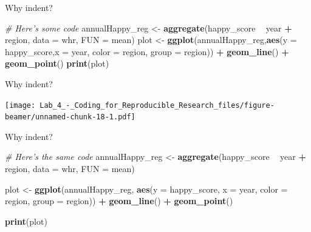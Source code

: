 \documentclass[ignorenonframetext,]{beamer}
\newenvironment{Shaded}{\begin{snugshade}}{\end{snugshade}}
\newcommand{\KeywordTok}[1]{\textcolor[rgb]{0.13,0.29,0.53}{\textbf{#1}}}
\newcommand{\DataTypeTok}[1]{\textcolor[rgb]{0.13,0.29,0.53}{#1}}
\newcommand{\StringTok}[1]{\textcolor[rgb]{0.31,0.60,0.02}{#1}}
\newcommand{\CommentTok}[1]{\textcolor[rgb]{0.56,0.35,0.01}{\textit{#1}}}
\newcommand{\OperatorTok}[1]{\textcolor[rgb]{0.81,0.36,0.00}{\textbf{#1}}}
\newcommand{\NormalTok}[1]{#1}
\begin{document}
\begin{frame}[fragile]{Why indent?}

\scriptsize

\begin{Shaded}
\begin{Highlighting}[]
\CommentTok{# Here's some code}
\NormalTok{annualHappy_reg <-}\StringTok{ }\KeywordTok{aggregate}\NormalTok{(happy_score }\OperatorTok{~}\StringTok{ }\NormalTok{year }\OperatorTok{+}\StringTok{ }\NormalTok{region, }\DataTypeTok{data =}\NormalTok{ whr, }\DataTypeTok{FUN =}\NormalTok{ mean)}
\NormalTok{plot <-}\StringTok{ }\KeywordTok{ggplot}\NormalTok{(annualHappy_reg,}\KeywordTok{aes}\NormalTok{(}\DataTypeTok{y =}\NormalTok{ happy_score,}\DataTypeTok{x =}\NormalTok{ year, }\DataTypeTok{color =}\NormalTok{ region, }
\DataTypeTok{group =}\NormalTok{ region)) }\OperatorTok{+}\StringTok{ }\KeywordTok{geom_line}\NormalTok{() }\OperatorTok{+}\StringTok{ }\KeywordTok{geom_point}\NormalTok{()}
\KeywordTok{print}\NormalTok{(plot)}
\end{Highlighting}
\end{Shaded}

\end{frame}

\begin{frame}{Why indent?}

\texttt{[image: Lab\_4\_-\_Coding\_for\_Reproducible\_Research\_files/figure-beamer/unnamed-chunk-18-1.pdf]}

\end{frame}

\begin{frame}[fragile]{Why indent?}

\begin{Shaded}
\begin{Highlighting}[]
\CommentTok{# Here's the same code}
\NormalTok{annualHappy_reg <-}\StringTok{ }
\StringTok{  }\KeywordTok{aggregate}\NormalTok{(happy_score }\OperatorTok{~}\StringTok{ }\NormalTok{year }\OperatorTok{+}\StringTok{ }\NormalTok{region,}
            \DataTypeTok{data =}\NormalTok{ whr,}
            \DataTypeTok{FUN =}\NormalTok{ mean)}

\NormalTok{plot <-}\StringTok{  }
\StringTok{  }\KeywordTok{ggplot}\NormalTok{(annualHappy_reg,}
         \KeywordTok{aes}\NormalTok{(}\DataTypeTok{y =}\NormalTok{ happy_score,}
             \DataTypeTok{x =}\NormalTok{ year, }
             \DataTypeTok{color =}\NormalTok{ region, }
             \DataTypeTok{group =}\NormalTok{ region)) }\OperatorTok{+}
\StringTok{  }\KeywordTok{geom_line}\NormalTok{() }\OperatorTok{+}\StringTok{ }
\StringTok{  }\KeywordTok{geom_point}\NormalTok{()}

\KeywordTok{print}\NormalTok{(plot)}
\end{Highlighting}
\end{Shaded}

\end{frame}
\end{document}
